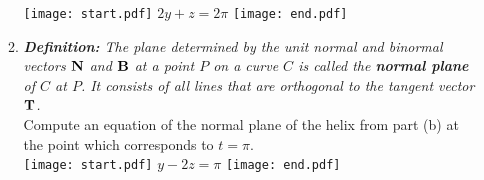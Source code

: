 \documentclass[12pt]{article}
\begin{document}
\begin{enumerate}
\begin{enumerate}
\texttt{[image: start.pdf]}
{{$2y+z=2\pi$}}
\texttt{[image: end.pdf]}


\item \emph{{\bf Definition:} The plane determined by the unit normal and binormal vectors ${\bf N}$ and ${\bf B}$ at a point $P$ on a curve $C$ is called the {\bf normal plane} of $C$ at $P$.  It consists of all lines that are orthogonal to the tangent vector ${\bf T}$.}\\

Compute an equation of the normal plane of the helix from part (b) at the point which corresponds to $t=\pi$. \\

\texttt{[image: start.pdf]}
{{$y-2z=\pi$}}
\texttt{[image: end.pdf]}


\end{enumerate}

\end{enumerate}
\end{document}
